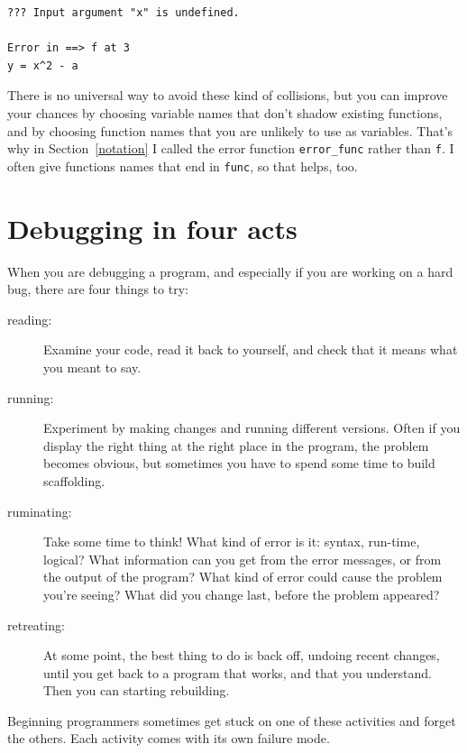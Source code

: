 \documentclass{book}
\begin{document}
\begin{verbatim}
??? Input argument "x" is undefined.

Error in ==> f at 3
y = x^2 - a
\end{verbatim}

There is no universal way to avoid these kind of
collisions, but you can improve your chances by choosing
variable names that don't shadow existing functions, and by
choosing function names that you are unlikely to use as variables.
That's why in Section~\ref{notation} I called the error function
{\tt error\_func} rather than {\tt f}. I often give functions
names that end in {\tt func}, so that helps, too.


\section{Debugging in four acts}

When you are debugging a program, and especially if you are
working on a hard bug, there are four things to try:

\begin{description}

\item[reading:] Examine your code, read it back to yourself, and
check that it means what you meant to say.

\item[running:] Experiment by making changes and running different
versions. Often if you display the right thing at the right place
in the program, the problem becomes obvious, but sometimes you have to
spend some time to build scaffolding.

\item[ruminating:] Take some time to think! What kind of error
is it: syntax, run-time, logical? What information can you get from
the error messages, or from the output of the program? What kind of
error could cause the problem you're seeing? What did you change
last, before the problem appeared?

\item[retreating:] At some point, the best thing to do is back
off, undoing recent changes, until you get back to a program that
works, and that you understand. Then you can starting rebuilding.

\end{description}

Beginning programmers sometimes get stuck on one of these activities
and forget the others. Each activity comes with its own failure
mode.
\end{document}
